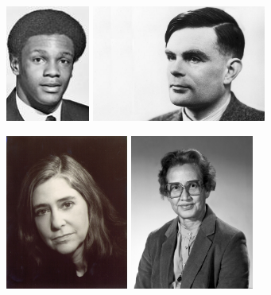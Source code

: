 \documentclass[xcolor={usenames,dvipsnames,svgnames,table},12pt]{beamer}
\begin{document}
\begin{frame}{}
  \begin{center}
    \includegraphics[height=1.5in]{ellis_skip_young.jpeg} \quad
    \includegraphics[height=1.5in]{Alan-Turing.jpeg}
  \end{center}
\end{frame}

\begin{frame}{}
  \begin{center}
    \includegraphics[height=2in]{Margaret-Hamilton.jpeg} \quad
    \includegraphics[height=2in]{katherine-johnson.jpeg}
  \end{center}
\end{frame}
\end{document}
